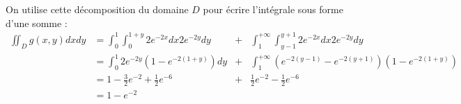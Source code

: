 {\begin{enumerate}
{		On utilise cette décomposition du domaine $D$ pour écrire l'intégrale sous forme d'une somme :
		\begin{align*}
			\iint_D g(x,y)dxdy &= \int_0^1 \int_0^{1+y}2e^{-2x}dx 2e^{-2y}dy &+&  \int_1^{+\infty} \int_{y-1}^{y+1}2e^{-2x}dx 2e^{-2y}dy	\\
			&= \int_0^1 2e^{-2y}(1-e^{-2(1+y)})dy &+&  \int_1^{+\infty} (e^{-2(y-1)}-e^{-2(y+1)})  (1-e^{-2(1+y)}) \\
			&= 1-\frac{3}{2}e^{-2}+\frac{1}{2}e^{-6} &+& \frac{1}{2}e^{-2}-\frac{1}{2}e^{-6} \\
			&= 1-e^{-2} &&
	\end{align*} }
\end{enumerate}}
